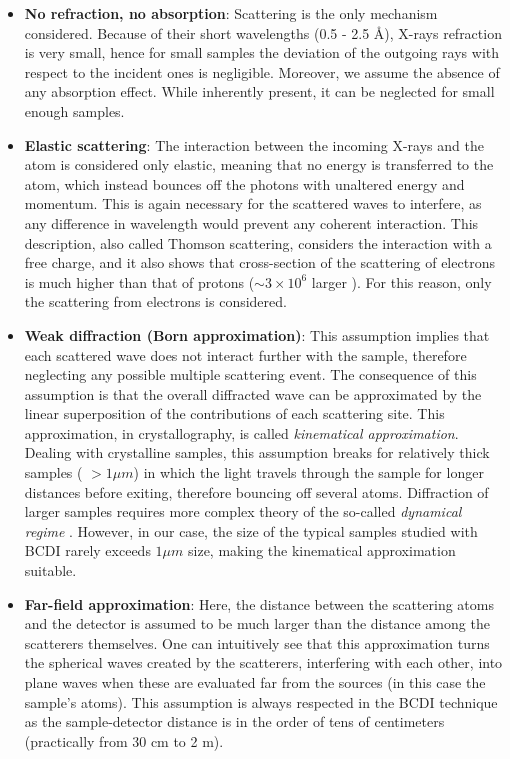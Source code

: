 \begin{itemize}
    \item \textbf{No refraction, no absorption}: Scattering is the only mechanism considered. Because of their short wavelengths
    (0.5 - 2.5 \AA), X-rays refraction is very small, hence for small samples the deviation of the outgoing rays with respect to the 
    incident ones is negligible. 
    Moreover, we assume the absence of any absorption effect. While inherently present, it can be neglected for small enough samples. 
    \item \textbf{Elastic scattering}: The interaction between the incoming X-rays and the atom is considered only elastic, meaning that 
    no energy is transferred to the atom, which instead bounces off the photons with unaltered energy and 
    momentum. This is again necessary for the scattered waves to interfere, as any difference in wavelength would 
    prevent any coherent interaction. This description, also called Thomson scattering, considers the interaction with a free charge, 
    and it also shows that cross-section of the scattering of electrons is much higher than that of protons ($\sim 3\times10^{6}$ larger ). 
    For this reason, only the scattering from electrons is considered. 
    \item \textbf{Weak diffraction (Born approximation)}: This assumption implies that each scattered wave does not interact 
    further with the sample, therefore neglecting any possible multiple scattering event. The consequence of this assumption 
    is that the overall diffracted wave can be approximated by the linear superposition of the contributions of each scattering site. 
    This approximation, in crystallography, is called \textit{kinematical approximation}. 
    Dealing with crystalline samples, this assumption breaks for relatively thick samples ( $ > 1 \mu m $) in which the 
    light travels through the sample for longer distances before exiting, therefore bouncing off several atoms. 
    Diffraction of larger samples requires more complex theory of the so-called \textit{dynamical regime} \cite{takagi1969dynamical, gorobtsov2016phase, Shabalin2017}.
    However, in our case, the size of the typical samples studied with BCDI rarely exceeds $ 1 \mu m $ size, making the 
    kinematical approximation suitable. 
    \item \textbf{Far-field approximation}: Here, the distance between the scattering atoms and the detector is assumed 
    to be much larger than the distance among the scatterers themselves. One can intuitively see that this approximation 
    turns the spherical waves created by the scatterers, interfering with each other, into plane waves when these are evaluated 
    far from the sources (in this case the sample's atoms). This assumption is always respected in the BCDI 
    technique as the sample-detector distance is in the order of tens of centimeters (practically from 30 cm to 2 m).


\end{itemize}
